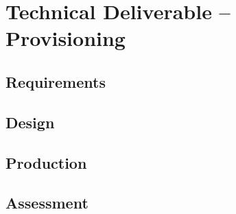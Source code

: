 \section{Technical Deliverable -- Provisioning}
% 
\subsection{Requirements}%

\subsection{Design}%

\subsection{Production}%

\subsection{Assessment}%

